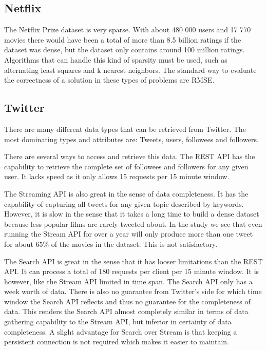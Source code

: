 \subsection{Netflix}
The Netflix Prize dataset is very sparse. With about 480 000 users and 17 770 movies there would have been a total of more than 8.5 billion ratings if the dataset was dense, but the dataset only contains around 100 million ratings. Algorithms that can handle this kind of sparsity must be used, such as alternating least squares and k nearest neighbors. The standard way to evaluate the correctness of a solution in these types of problems are RMSE.

\subsection{Twitter}\label{sec:prestrud-eval-twitter}
There are many different data types that can be retrieved from Twitter. The most dominating types and attributes are: Tweets, users, followees and followers.

There are several ways to access and retrieve this data. The REST API has the capability to retrieve the complete set of followees and followers for any given user. It lacks speed as it only allows 15 requests per 15 minute window.

The Streaming API is also great in the sense of data completeness. It has the capability of capturing all tweets for any given topic described by keywords. However, it is slow in the sense that it takes a long time to build a dense dataset because less popular films are rarely tweeted about. In the study we see that even running the Stream API for over a year will only produce more than one tweet for about 65\% of the movies in the dataset. This is not satisfactory.

The Search API is great in the sense that it has looser limitations than the REST API. It can process a total of 180 requests per client per 15 minute window. It is however, like the Stream API limited in time span. The Search API only has a week worth of data. There is also no guarantee from Twitter's side for which time window the Search API reflects and thus no guarantee for the completeness of data. This renders the Search API almost completely similar in terms of data gathering capability to the Stream API, but inferior in certainty of data completeness. A slight advantage for Search over Stream is that keeping a persistent connection is not required which makes it easier to maintain.

